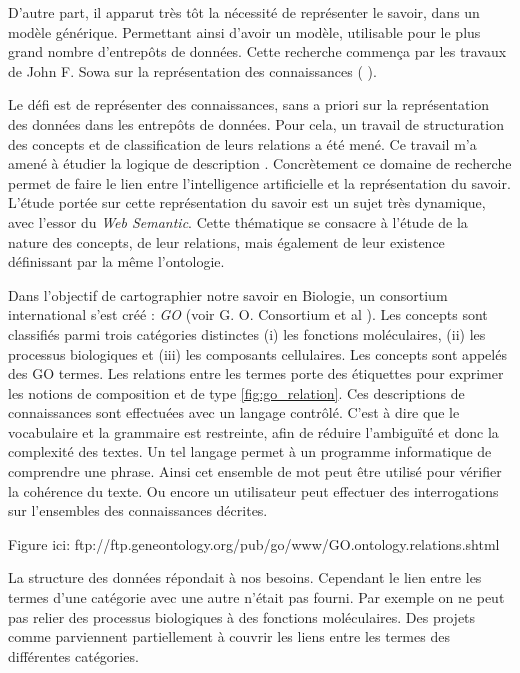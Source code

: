 \begin{refsegment}
D'autre part, il apparut très tôt la nécessité de représenter le savoir, dans un modèle générique. Permettant ainsi d'avoir un modèle, utilisable pour le plus grand nombre d'entrepôts de données. Cette recherche commença par les travaux de John F. Sowa sur la représentation des connaissances ( \citeyear{sowa92,sowa99}).

Le défi est de représenter des connaissances, sans a priori sur la représentation des données dans les entrepôts de données. Pour cela, un travail de structuration des concepts et de classification de leurs relations a été mené. Ce travail m'a amené à étudier la logique de description \cite{baader2003description}. Concrètement ce domaine de recherche permet de faire le lien entre l'intelligence artificielle et la représentation du savoir. L'étude portée sur cette représentation du savoir est un sujet très dynamique, avec l'essor du \textit{Web Semantic}. Cette thématique se consacre à l'étude de la nature des concepts, de leur relations, mais également de leur existence définissant par la même l'ontologie.

Dans l'objectif de cartographier notre savoir en Biologie, un consortium international s'est créé : \textit{\gls{GO}} (voir G. O. Consortium
et al \citeyear{go2001,go2004}). Les concepts sont classifiés parmi trois catégories distinctes (i) les fonctions moléculaires, (ii) les processus biologiques et (iii) les composants cellulaires. Les concepts sont appelés des GO termes. Les relations entre les termes porte des étiquettes pour exprimer les notions de composition et de type \cref{fig:go_relation}. Ces descriptions de connaissances sont effectuées avec un langage contrôlé.  C'est à dire que le vocabulaire et la grammaire est restreinte, afin de réduire l'ambiguïté et donc la complexité des textes. Un tel langage permet à un programme informatique de comprendre une phrase. Ainsi cet ensemble de mot peut être utilisé pour vérifier la cohérence du texte. Ou encore un utilisateur peut effectuer des interrogations sur l'ensembles des connaissances décrites.

Figure ici: ftp://ftp.geneontology.org/pub/go/www/GO.ontology.relations.shtml


La structure des données répondait à nos besoins. Cependant le lien entre les termes d'une catégorie avec une autre n'était pas fourni. Par exemple on ne peut pas relier des processus biologiques à des fonctions moléculaires. Des projets comme \cite{AdditionalGO2006} parviennent partiellement à couvrir les liens  entre les termes des différentes catégories.


\end{refsegment}
